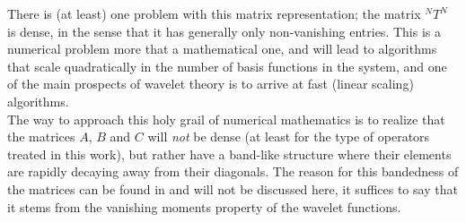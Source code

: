 \noindent
There is (at least) one problem with this matrix representation; the matrix 
$^NT^N$ is dense, in the sense that it has generally only non-vanishing 
entries. This is a numerical problem more that a mathematical one, and will 
lead to algorithms that scale quadratically in the number of basis functions in
the system, and one of the main prospects of wavelet theory is to arrive at 
fast (linear scaling) algorithms.\\

\noindent
The way to approach this holy grail of 
numerical mathematics is to realize that the matrices $A$, $B$ and $C$ will 
\emph{not} be dense (at least for the type of operators treated in this work), 
but rather have a band-like structure where their elements are rapidly
decaying away from their diagonals. The reason for this bandedness of the 
matrices can be found in \cite{Beylkin90} and will not be discussed here, it 
suffices
to say that it stems from the vanishing moments property of the wavelet
functions.\\

